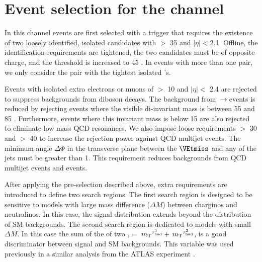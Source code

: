 \section{\texorpdfstring{Event selection for the \Tau\Tau channel}{Event selection for the tau-tau channel}}
\label{sect:tauTauCuts}
In this channel events are first selected with a trigger \cite{CMS:2013hoa,Chatrchyan:2012xi,Chatrchyan:2011nv}
that requires the existence of
two loosely identified, isolated \Tau candidates with \PT $>$ 35 \GeV and $|\eta|<$2.1.   Offline,
the \Tau identification requirements are tightened, the two \Tau candidates must be of
opposite charge, and the \PT threshold is increased to 45 \GeV.
In events with more than one \Tau\Tau pair, we only consider the pair with the tightest isolated \Tau's. 

Events with isolated extra electrons or muons of \PT $>$ 10 \GeV and $|\eta| <$ 2.4 
are rejected to suppress %
backgrounds from diboson decays.
The background from \Z$\rightarrow$\Tau\Tau events is reduced by rejecting events where the visible
di-\Tau invariant mass is between 55 and 85 \GeV.  Furthermore, events where this invariant mass is below 15 \GeV
are also rejected to eliminate low mass QCD resonances.
We also impose loose requirements \MET $>$ 30 \GeV and \mttwo $>$ 40 \GeV to increase the rejection power against QCD multijet events.
The minimum angle $\Delta \Phi$ in the transverse plane between the $\VEtmiss$ and any of the jets %
must be greater than 1.  This requirement reduces backgrounds from QCD multijet events and \wjets events.


After applying the pre-selection described above,
extra requirements are introduced to define two search regions.
The first search region is designed to be sensitive to models
with large mass difference ($\Delta M$) between charginos and neutralinos.
In this case, the \mttwo signal distribution extends beyond the 
distribution of SM backgrounds.
The second search region is dedicated to models with small $\Delta M$.  In this case
the sum of the \mt of two \Tau, \SumMT = $\,{m_{\rm T}}^{\tau_{\rm had}^1} + \,{m_{\rm T}}^{\tau_{\rm had}^2}$, is a good discriminator
between signal and SM backgrounds. 
This variable was used previously in a similar analysis from the ATLAS experiment \cite{Aad:2014yka}.


